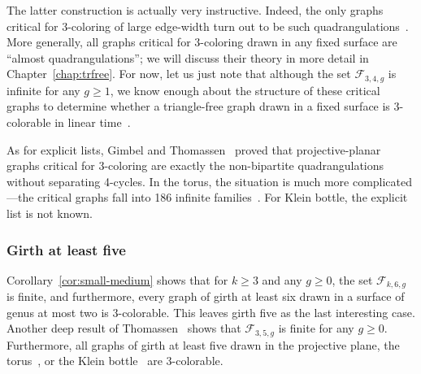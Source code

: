 \documentclass[12pt,twoside,openright,a4paper]{book}
\newcommand{\FF}{\mathcal{F}}
\begin{document}
The latter construction is actually very instructive.  Indeed, the only graphs critical for $3$-coloring of large edge-width turn out
to be such quadrangulations~\cite{trfree6}.  More generally, all graphs critical for $3$-coloring drawn in any fixed surface
are ``almost quadrangulations''; we will discuss their theory in more detail in Chapter~\ref{chap:trfree}.
For now, let us just note that although the set $\FF_{3,4,g}$ is infinite for any $g\ge 1$, we know enough about the
structure of these critical graphs to determine whether a triangle-free graph drawn in a fixed surface is $3$-colorable
in linear time~\cite{trfree7}.

As for explicit lists, Gimbel and Thomassen~\cite{gimbel} proved that projective-planar graphs critical for $3$-coloring
are exactly the non-bipartite quadrangulations without separating 4-cycles.  In the torus, the situation is much more complicated---the
critical graphs fall into 186 infinite families~\cite{dpfuture}.  For Klein bottle, the explicit list is not known.

\subsubsection*{Girth at least five}

Corollary~\ref{cor:small-medium} shows that for $k\ge 3$ and any $g\ge 0$, the set $\FF_{k,6,g}$ is finite, and
furthermore, every graph of girth at least six drawn in a surface of genus at most two is $3$-colorable.
This leaves girth five as the last interesting case.  Another deep result of Thomassen~\cite{thomassen-surf}
shows that $\FF_{3,5,g}$ is finite for any $g\ge 0$.  Furthermore, all graphs of girth at least five drawn in the
projective plane, the torus~\cite{thom-torus}, or the Klein bottle~\cite{tw-klein} are $3$-colorable.
\end{document}
